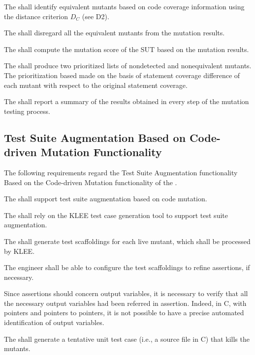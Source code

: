 \RQ{} The \FAQAS shall identify equivalent mutants based on code coverage information using the distance criterion $D_C$ (see D2).

\RQ{} The \FAQAS shall disregard all the equivalent mutants from the mutation results.

\RQ{} The \FAQAS shall compute the mutation score of the SUT based on the mutation results.

\RQ{} The \FAQAS shall produce two prioritized lists of nondetected and nonequivalent mutants. 
The prioritization based made on the basis of statement coverage difference of each mutant with respect to the original statement coverage.



\RQ{} The \FAQAS shall report a summary of the results obtained in every step of the mutation testing process.



\subsection{Test Suite Augmentation Based on Code-driven Mutation Functionality}
\label{sec:codeDrivenAugmentation}

The following requirements regard the Test Suite Augmentation functionality Based on the Code-driven Mutation functionality of the \FAQAS.

\RQ{} The \FAQAS shall support test suite augmentation based on code mutation.

\RQ{} The \FAQAS shall rely on the KLEE test case generation tool to support test suite augmentation.

\RQ{} The \FAQAS shall generate test scaffoldings for each live mutant, which shall be processed by KLEE.

\RQ{} The engineer shall be able to configure the test scaffoldings to refine assertions, if necessary.

\remark Since assertions should concern output variables, it is necessary to verify that all the necessary output variables had been referred in assertion. Indeed, in C, with pointers and pointers to pointers, it is not possible to have a precise automated identification of output variables.

\RQ{} The \FAQAS shall generate a tentative unit test case (i.e., a source file in C) that kills the mutants.

